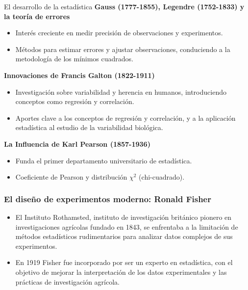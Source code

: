 ﻿\documentclass{beamer}
\begin{document}
\begin{frame}{El desarrollo de la estadística}
    \textbf{Gauss (1777-1855), Legendre (1752-1833) y la teoría de errores}
    \begin{itemize}
        \item Interés creciente en medir precisión de observaciones y experimentos.
        \item Métodos para estimar errores y ajustar observaciones, conduciendo a la metodología de los mínimos cuadrados.
    \end{itemize}
    
    \textbf{Innovaciones de Francis Galton (1822-1911)}
    \begin{itemize}
        \item Investigación sobre variabilidad y herencia en humanos, introduciendo conceptos como regresión y correlación.
        \item Aportes clave a los conceptos de regresión y correlación, y a la aplicación estadística al estudio de la variabilidad biológica.
    \end{itemize}
    
    \textbf{La Influencia de Karl Pearson (1857-1936)}
    \begin{itemize}
        \item Funda el primer departamento universitario de estadística.
        \item Coeficiente de Pearson y distribución $\chi^2$ (chi-cuadrado).
    \end{itemize}
\end{frame}

\begin{frame}
\frametitle{El diseño de experimentos moderno: Ronald Fisher}
    \begin{itemize}
        \item El Instituto Rothamsted, instituto de investigación británico pionero en investigaciones agrícolas fundado en 1843, se enfrentaba a la limitación de métodos estadísticos rudimentarios para analizar datos complejos de sus experimentos.
        \item En 1919 Fisher fue incorporado por ser un experto en estadística, con el objetivo de mejorar la interpretación de los datos experimentales y las prácticas de investigación agrícola.
    \end{itemize}
\end{frame}
\end{document}
